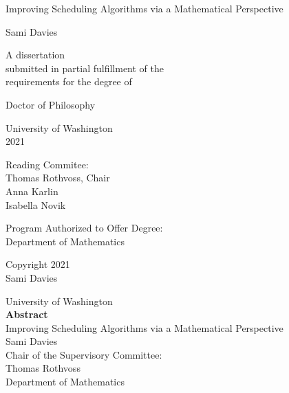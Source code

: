 \documentclass[12pt]{book}
\title{\mytitle}
\author{\myauthor}
\theoremstyle{theorem}
\theoremstyle{remark}
\theoremstyle{definition}
\theoremstyle{plain}
\theoremstyle{plain}
\theoremstyle{plain}
\theoremstyle{definition}
\theoremstyle{theorem}
\def\mytitle{Improving Scheduling Algorithms via a Mathematical Perspective}
\def\myauthor{Sami Davies}
\def\year{2021}
\begin{document}
\pagestyle{empty}

\begin{center}
  {\huge \mytitle}
  \vfill

  {\Large \myauthor}
  \vfill

  \begin{spacing}{1}
    A dissertation \\
    submitted in partial fulfillment of the \\
    requirements for the degree of
  \end{spacing}
  \vfill

  Doctor of Philosophy
  \vfill

  University of Washington \\
  \year
  \vfill

  Reading Commitee: \\
  Thomas Rothvoss, Chair \\
Anna Karlin \\
 Isabella Novik
  \vfill

  \begin{spacing}{1}
    Program Authorized to Offer Degree: \\
    Department of Mathematics
  \end{spacing}
  \clearpage

  \textcopyright{} Copyright \year\\
  \myauthor
  \clearpage
\end{center}

\pagestyle{plain}
\setcounter{page}{1}

\begin{center}
  University of Washington \\[1em]
  \textbf{Abstract}        \\[1em]
  \mytitle                 \\[1em]
  \myauthor                \\[1em]

  Chair of the Supervisory Committee: \\[-0.5em]
  Thomas Rothvoss \\[-0.5em]
  Department of Mathematics
  \\[2em]
\end{center}

\end{document}
